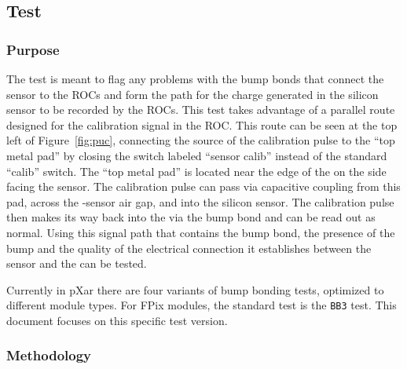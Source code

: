 
\newpage

\subsection{\bb Test}
\label{ss:bb}

\subsubsection{Purpose}

The \bb test is meant to flag any problems with the bump bonds that connect the sensor to the ROCs
and form the path for the charge generated in the silicon sensor to be recorded by the ROCs.
This test takes advantage of a parallel route designed for the calibration signal in the ROC.
This route can be seen at the top left of Figure~\ref{fig:puc}, 
connecting the source of the \vcal calibration pulse to the ``top metal pad'' 
by closing the switch labeled ``sensor calib'' instead of the standard ``calib'' switch.
The ``top metal pad'' is located near the edge of the \roc on the side facing the sensor.
The calibration pulse can pass via capacitive coupling from this pad, 
across the \roc-sensor air gap, and into the silicon sensor.
The calibration pulse then makes its way back into the \roc via the bump bond and can be read out as normal.
Using this signal path that contains the bump bond, 
the presence of the bump and the quality of the electrical connection it establishes between the sensor and the \roc can be tested.

Currently in pXar there are four variants of bump bonding tests, optimized to different module types.  
For FPix modules, the standard test is the {\tt BB3} test.
This document focuses on this specific \bb test version.

\subsubsection{Methodology}

